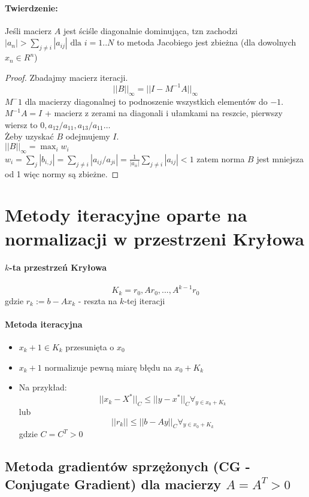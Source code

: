 \documentclass{article}
\begin{document}
\paragraph{Twierdzenie:} Jeśli macierz $ A $ jest ściśle diagonalnie dominująca, tzn zachodzi
$ |a_n|>\sum_{j\not=i}|a_{ij}|\text{ dla }i=1..N $
 to metoda Jacobiego jest zbieżna (dla dowolnych $ x_n\in R^n $)
\begin{proof}
	Zbadajmy macierz iteracji.
	$$ ||B||_\infty = ||I-M^{-1}A||_\infty $$
	$ M^-1 $ dla macierzy diagonalnej to podnoszenie wszystkich elementów do $ -1 $.\\
	$ M^{-1}A=I $ + macierz z zerami na diagonali i ułamkami na reszcie, pierwszy wiersz to $ 0, a_{12}/a_{11}, a_{13}/a_{11}\ldots $\\
	Żeby uzyskać $ B $ odejmujemy $I$.\\
	$ ||B||_\infty = \max_i w_i  $\\
	$ w_i = \sum_j |b_{i,j}|=\sum_{j\not=i}|a_{ij}/a_{ji}|=\frac1{|a_{ii}|}\sum_{j\not=i}|a_{ij}|<1 $
	zatem norma $ B $ jest mniejsza od 1 więc normy są zbieżne.
\end{proof}

\section{Metody iteracyjne oparte na normalizacji w przestrzeni Kryłowa}
\paragraph{$k$-ta przestrzeń Kryłowa}
$$ K_k = {r_0, Ar_0, ...,A^{k-1}  r_0} $$
gdzie $ r_k:=b-Ax_k $ - reszta na $ k $-tej iteracji
\paragraph{Metoda iteracyjna}
\begin{itemize}
	\item $ x_k+1 \in K_k $ przesunięta o $ x_0 $
	\item $ x_k+1 $ normalizuje pewną miarę błędu na $ x_0+K_k $
	\item Na przykład: $$ ||x_k-X^*||_C\leq ||y-x^*||_C \forall_{y\in x_0+K_k} $$
	lub $$ ||r_k||\leq ||b-Ay||_C \forall_{y\in x_0+K_k} $$
	gdzie $ C =C^T>0 $
\end{itemize}

\subsection{Metoda gradientów sprzężonych (CG - Conjugate Gradient) dla macierzy $A=A^T>0$}
\end{document}
